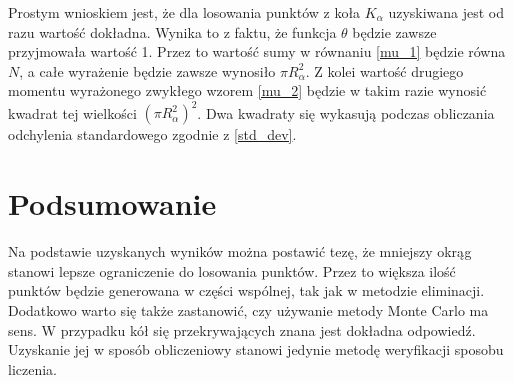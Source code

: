 \documentclass[a4paper, 12pt]{article}
\begin{document}
    \noaka Prostym wnioskiem jest, że dla losowania punktów z koła $K_\alpha$ uzyskiwana jest od razu wartość dokładna.
    Wynika to z faktu, że funkcja $\theta$ będzie zawsze przyjmowała wartość 1. 
    Przez to wartość sumy w równaniu \eqref{mu_1} będzie równa $N$, a całe wyrażenie będzie zawsze wynosiło $\pi R_\alpha^2$.
    Z kolei wartość drugiego momentu wyrażonego zwykłego wzorem \eqref{mu_2} będzie w takim razie wynosić kwadrat tej wielkości $(\pi R_\alpha^2)^2$.
    Dwa kwadraty się wykasują podczas obliczania odchylenia standardowego zgodnie z \eqref{std_dev}.

    \newpage

    \section{Podsumowanie}

    Na podstawie uzyskanych wyników można postawić tezę, że mniejszy okrąg stanowi lepsze ograniczenie do losowania punktów.
    Przez to większa ilość punktów będzie generowana w części wspólnej, tak jak w metodzie eliminacji.
    Dodatkowo warto się także zastanowić, czy używanie metody Monte Carlo ma sens. 
    W przypadku kół się przekrywających znana jest dokładna odpowiedź.
    Uzyskanie jej w sposób obliczeniowy stanowi jedynie metodę weryfikacji sposobu liczenia.
\end{document}
